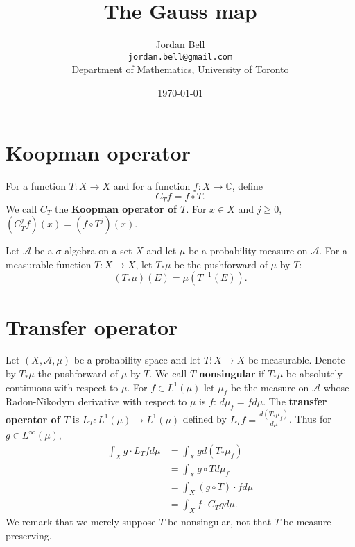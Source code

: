 \documentclass{article}
\theoremstyle{definition}
\begin{document}
\title{The Gauss map}
\author{Jordan Bell\\ \texttt{jordan.bell@gmail.com}\\Department of Mathematics, University of Toronto}
\date{\today}

\maketitle


\section{Koopman operator}
For a function $T:X \to X$ and for a function $f:X \to \mathbb{C}$, define
\[
C_T f = f \circ T.
\]
We call $C_T$ the \textbf{Koopman operator of $T$}.
For $x \in X$ and $j \geq 0$, $(C_T^j f)(x) = (f \circ T^j)(x)$.

Let $\mathscr{A}$ be a $\sigma$-algebra on a set $X$ and let
$\mu$ be a probability measure on $\mathscr{A}$. 
For a measurable function $T:X \to X$, let $T_*\mu$ be the pushforward of
$\mu$ by $T$:
\[
(T_* \mu)(E) = \mu(T^{-1}(E)).
\]





\section{Transfer operator}
Let $(X,\mathscr{A},\mu)$ be a probability space and let $T:X \to X$ be measurable.
Denote by $T_* \mu$ the pushforward of $\mu$ by $T$. We call $T$ \textbf{nonsingular} if 
$T_*\mu$ be absolutely continuous with respect to $\mu$. 
For $f \in L^1(\mu)$ let $\mu_f$ be the measure on $\mathscr{A}$ whose Radon-Nikodym derivative with respect
to $\mu$ is $f$: $d\mu_f = f d\mu$. 
The \textbf{transfer operator of $T$} is $L_T : L^1(\mu) \to L^1(\mu)$ defined by
$L_T f = \frac{d(T_* \mu_f)}{d\mu}$.
Thus for $g \in L^\infty(\mu)$,
\begin{align*}
\int_X g \cdot L_Tf d\mu &= \int_X g d(T_*\mu_f)\\
&=\int_X g \circ T d\mu_f\\
&=\int_X (g \circ T) \cdot f d\mu\\
&=\int_X f \cdot C_T g  d\mu.
\end{align*}
We remark that we merely suppose  $T$ be nonsingular, not that $T$ be measure preserving.
\end{document}
